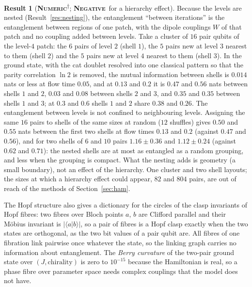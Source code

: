 \documentclass[11pt]{article}
\newcommand{\numeric}{\textbf{\textsc{Numeric}}}
\newcommand{\negres}{\textbf{\textsc{Negative}}}
\newcommand{\snap}{\textsuperscript{$\dagger$}}      %
\theoremstyle{definition}
\newtheorem{result}{Result}
\begin{document}
\begin{result}[\numeric\snap; \negres\ for a hierarchy effect]\label{res:hopf-tiers}
Because the levels are nested (Result~\ref{res:nesting}), the entanglement ``between iterations'' is the entanglement between regions of one patch, with the dipole couplings $W$ of that patch and no coupling added between levels. Take a cluster of $16$ pair qubits of the level-$4$ patch: the $6$ pairs of level $2$ (shell $1$), the $5$ pairs new at level $3$ nearest to them (shell $2$) and the $5$ pairs new at level $4$ nearest to them (shell $3$). In the ground state, with the cat doublet resolved into one classical pattern so that the parity correlation $\ln2$ is removed, the mutual information between shells is $0.014$ nats or less at flow time $0.05$, and at $0.13$ and $0.2$ it is $0.47$ and $0.56$ nats between shells $1$ and $2$, $0.03$ and $0.08$ between shells $2$ and $3$, and $0.35$ and $0.35$ between shells $1$ and $3$; at $0.3$ and $0.6$ shells $1$ and $2$ share $0.38$ and $0.26$. The entanglement between levels is not confined to neighbouring levels. Assigning the same $16$ pairs to shells of the same sizes at random ($12$ shuffles) gives $0.50$ and $0.55$ nats between the first two shells at flow times $0.13$ and $0.2$ (against $0.47$ and $0.56$), and for two shells of $6$ and $10$ pairs $1.16\pm0.36$ and $1.12\pm0.24$ (against $0.62$ and $0.71$): the nested shells are at most as entangled as a random grouping, and less when the grouping is compact. What the nesting adds is geometry (a small boundary), not an effect of the hierarchy. One cluster and two shell layouts; the sizes at which a hierarchy effect could appear, $82$ and $804$ pairs, are out of reach of the methods of Section~\ref{sec:ham}.
\end{result}
The Hopf structure also gives a dictionary for the circles of the clasp invariants of Hopf fibres: two fibres over Bloch points $a$, $b$ are Clifford parallel and their M\"obius invariant is $|\langle a|b\rangle|$, so a pair of fibres is a Hopf clasp exactly when the two states are orthogonal, as the two bit values of a pair qubit are. All fibres of one fibration link pairwise once whatever the state, so the linking graph carries no information about entanglement. The \emph{Berry curvature} of the two-pair ground state over $(J,\text{chirality})$ is zero to $10^{-15}$ because the Hamiltonian is real, so a phase fibre over parameter space needs complex couplings that the model does not have.

\end{document}
